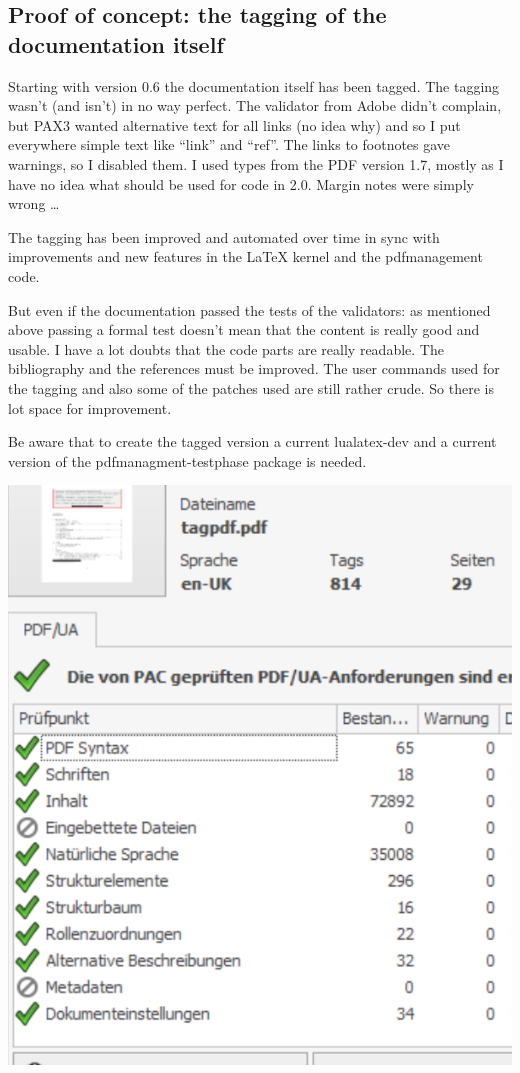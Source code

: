 \documentclass[DIV=12,parskip=half-,bibliography=totoc]{scrartcl}
\newcommand\PDF{PDF}
\begin{document}
\subsection{Proof of concept: the tagging of the documentation itself}

Starting with version 0.6 the documentation itself has been tagged. The tagging wasn't (and isn't) in no way perfect. The validator from Adobe didn't complain, but PAX3 wanted alternative text for all links (no idea why) and so I put everywhere simple text like \enquote{link} and \enquote{ref}. The links to footnotes gave warnings, so I disabled them. I used types from the \PDF{} version 1.7, mostly as I have no idea what should be used for code in 2.0. Margin notes were simply wrong \ldots

The tagging has been improved and automated over time in sync with improvements and new features in the LaTeX kernel and the pdfmanagement code.

But even if the documentation passed the tests of the validators:  as mentioned above passing a formal test doesn't mean that the content is really good and usable. I have a lot doubts that the code parts are really readable. The bibliography and the references must be improved. The user commands used for the tagging and also some of the patches used are still rather crude. So there is lot space for improvement.

\begin{tcolorbox}[before upper=\tagpdfparaOn]
Be aware that to create the tagged version a current lualatex-dev and a current version of the pdfmanagment-testphase package is needed.
\end{tcolorbox}

\tagpdfparaOff

\includegraphics{pac3}
\tagmcend\tagstructend
\end{document}
